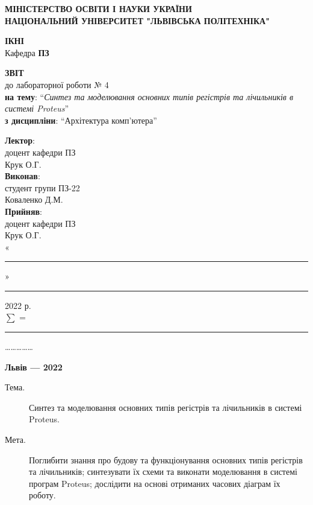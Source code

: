 \documentclass{article}
\newcommand\subject{Архітектура комп'ютера}
\newcommand\lecturer{доцент кафедри ПЗ\\Крук О.Г.}
\newcommand\teacher{доцент кафедри ПЗ\\Крук О.Г.}
\newcommand\mygroup{ПЗ-22}
\newcommand\lab{4}
\newcommand\theme{Синтез та моделювання основних типів регістрів та лічильників в системі Proteus}
\newcommand\purpose{Поглибити знання про будову та функціонування основних типів регістрів та лічильників; синтезувати їх схеми та виконати моделювання в системі програм Proteus; дослідити на основі отриманих часових діаграм їх роботу}
\begin{document}
\begin{normalsize}
	\begin{titlepage}
		\thispagestyle{empty}
		\begin{center}
			\textbf{МІНІСТЕРСТВО ОСВІТИ І НАУКИ УКРАЇНИ\\
				НАЦІОНАЛЬНИЙ УНІВЕРСИТЕТ "ЛЬВІВСЬКА ПОЛІТЕХНІКА"}
		\end{center}
		\begin{flushright}
			\textbf{ІКНІ}\\
			Кафедра \textbf{ПЗ}
		\end{flushright}
		\vspace{200pt}
		\begin{center}
			\textbf{ЗВІТ}\\
			\vspace{10pt}
			до лабораторної роботи № \lab\\
			\textbf{на тему}: “\textit{\theme}”\\
			\textbf{з дисципліни}: “\subject”
		\end{center}
		\vspace{112pt}
		\begin{flushright}
			
			\textbf{Лектор}:\\
			\lecturer\\
			\vspace{28pt}
			\textbf{Виконав}:\\
			
			студент групи \mygroup\\
			Коваленко Д.М.\\
			\vspace{28pt}
			\textbf{Прийняв}:\\
			
			\teacher\\
			
			\vspace{28pt}
			«\rule{1cm}{0.15mm}» \rule{1.5cm}{0.15mm} 2022 р.\\
			$\sum$ = \rule{1cm}{0.15mm}……………\\
			
		\end{flushright}
		\vspace{\fill}
		\begin{center}
			\textbf{Львів — 2022}
		\end{center}
	\end{titlepage}
		
	\begin{description}
		\item[Тема.] \theme.
		\item[Мета.] \purpose.
	\end{description}


\end{normalsize}
\end{document}
